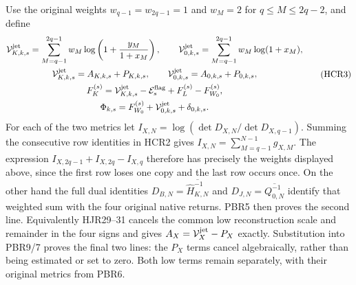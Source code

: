 \documentclass[11pt,a4paper]{article}
\begin{document}
Use the original weights $w_{q-1}=w_{2q-1}=1$ and
$w_M=2$ for $q\le M\le2q-2$, and define
\[
\begin{gathered}
 \mathcal V_{K,k,s}^{\rm jet}
   =\sum_{M=q-1}^{2q-1}w_M
                      \log\left(1+\frac{y_M}{1+x_M}\right),\qquad
 \mathcal V_{0,k,s}^{\rm jet}
   =\sum_{M=q-1}^{2q-1}w_M\log(1+x_M),\\
 \mathcal V_{K,k,s}^{\rm jet}=A_{K,k,s}+P_{K,k,s},\qquad
 \mathcal V_{0,k,s}^{\rm jet}=A_{0,k,s}+P_{0,k,s},\\
 F_K^{(s)}
   =\mathcal V_{K,k,s}^{\rm jet}-\mathcal E_s^{\rm flag}
                                      +F_L^{(s)}-F_{W_0}^{(s)},\\
 \Phi_{k,s}=F_{W_0}^{(s)}+\mathcal V_{0,k,s}^{\rm jet}
                                      +\delta_{0,k,s}.
\end{gathered}\tag{HCR3}
\]
For each of the two metrics let
$I_{X,N}=\log(\det D_{X,N}/\det D_{X,q-1})$.
Summing the consecutive row identities in HCR2 gives
$I_{X,N}=\sum_{M=q-1}^{N-1}g_{X,M}$.
The expression
$I_{X,2q-1}+I_{X,2q}-I_{X,q}$ therefore has precisely the
weights displayed above, since the first row loses one
copy and the last row occurs once. On the other hand the
full dual identities
$D_{B,N}=\overline{\widehat H_{K,N}^{-1}}$ and
$D_{J,N}=\overline{Q_{0,N}^{-1}}$ identify that weighted
sum with the four original native returns. PBR5 then proves
the second line. Equivalently HJR29--31 cancels the common
low reconstruction scale and remainder in the four signs
and gives $A_X=\mathcal V_X^{\rm jet}-P_X$ exactly.
Substitution into PBR9/7 proves the final two lines:
the $P_X$ terms cancel algebraically, rather than being
estimated or set to zero. Both low terms remain separately,
with their original metrics from PBR6.
\end{document}
